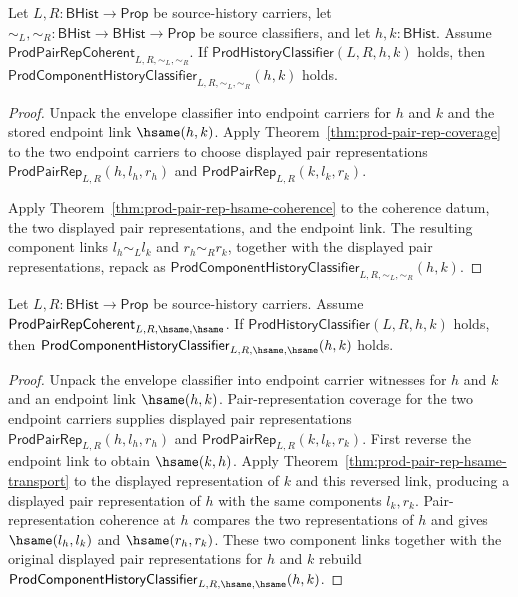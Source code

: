 \begin{theorem}
\label{thm:prod-history-envelope-to-componentwise-coherent}
Let $L,R:\mathsf{BHist}\to\mathsf{Prop}$ be source-history carriers, let
$\sim_L,\sim_R:\mathsf{BHist}\to\mathsf{BHist}\to\mathsf{Prop}$ be source
classifiers, and let $h,k:\mathsf{BHist}$. Assume
$\mathsf{ProdPairRepCoherent}_{L,R,\sim_L,\sim_R}$. If
$\mathsf{ProdHistoryClassifier}(L,R,h,k)$ holds, then
$\mathsf{ProdComponentHistoryClassifier}_{L,R,\sim_L,\sim_R}(h,k)$ holds.
\end{theorem}
\begin{proof}
Unpack the envelope classifier into endpoint carriers for $h$ and $k$ and the
stored endpoint link $\hsame(h,k)$. Apply
Theorem~\ref{thm:prod-pair-rep-coverage} to the two endpoint carriers to choose
displayed pair representations
$\mathsf{ProdPairRep}_{L,R}(h,l_h,r_h)$ and
$\mathsf{ProdPairRep}_{L,R}(k,l_k,r_k)$.

Apply Theorem~\ref{thm:prod-pair-rep-hsame-coherence} to the coherence datum,
the two displayed pair representations, and the endpoint link. The resulting
component links $l_h\sim_L l_k$ and $r_h\sim_R r_k$, together with the displayed
pair representations, repack as
$\mathsf{ProdComponentHistoryClassifier}_{L,R,\sim_L,\sim_R}(h,k)$.
\end{proof}

\begin{theorem}
\label{thm:prod-history-envelope-to-componentwise-hsame}
Let $L,R:\mathsf{BHist}\to\mathsf{Prop}$ be source-history carriers. Assume
$\mathsf{ProdPairRepCoherent}_{L,R,\hsame,\hsame}$. If
$\mathsf{ProdHistoryClassifier}(L,R,h,k)$ holds, then
$\mathsf{ProdComponentHistoryClassifier}_{L,R,\hsame,\hsame}(h,k)$ holds.
\end{theorem}
\begin{proof}
Unpack the envelope classifier into endpoint carrier witnesses for $h$ and
$k$ and an endpoint link $\hsame(h,k)$. Pair-representation coverage for the
two endpoint carriers supplies displayed pair representations
$\mathsf{ProdPairRep}_{L,R}(h,l_h,r_h)$ and
$\mathsf{ProdPairRep}_{L,R}(k,l_k,r_k)$. First reverse the endpoint link to
obtain $\hsame(k,h)$. Apply
Theorem~\ref{thm:prod-pair-rep-hsame-transport} to the displayed
representation of $k$ and this reversed link, producing a displayed pair
representation of $h$ with the same components $l_k,r_k$.
Pair-representation coherence at $h$ compares the two representations of $h$
and gives
$\hsame(l_h,l_k)$ and $\hsame(r_h,r_k)$. These two component links together
with the original displayed pair representations for $h$ and $k$ rebuild
$\mathsf{ProdComponentHistoryClassifier}_{L,R,\hsame,\hsame}(h,k)$.
\end{proof}

